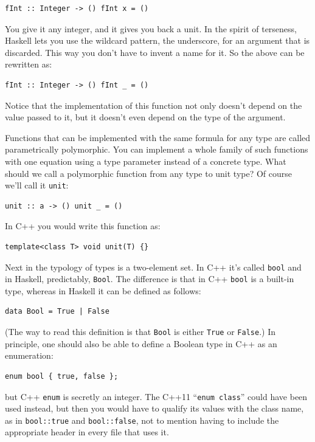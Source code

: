 \begin{verbatim}
fInt :: Integer -> () fInt x = ()
\end{verbatim}

You give it any integer, and it gives you back a unit. In the spirit of
terseness, Haskell lets you use the wildcard pattern, the underscore,
for an argument that is discarded. This way you don't have to invent a
name for it. So the above can be rewritten as:

\begin{verbatim}
fInt :: Integer -> () fInt _ = ()
\end{verbatim}

Notice that the implementation of this function not only doesn't depend
on the value passed to it, but it doesn't even depend on the type of the
argument.

Functions that can be implemented with the same formula for any type are
called parametrically polymorphic. You can implement a whole family of
such functions with one equation using a type parameter instead of a
concrete type. What should we call a polymorphic function from any type
to unit type? Of course we'll call it \texttt{unit}:

\begin{verbatim}
unit :: a -> () unit _ = ()
\end{verbatim}

In C++ you would write this function as:

\begin{verbatim}
template<class T> void unit(T) {}
\end{verbatim}

Next in the typology of types is a two-element set. In C++ it's called
\texttt{bool} and in Haskell, predictably, \texttt{Bool}. The difference
is that in C++ \texttt{bool} is a built-in type, whereas in Haskell it
can be defined as follows:

\begin{verbatim}
data Bool = True | False
\end{verbatim}

(The way to read this definition is that \texttt{Bool} is either
\texttt{True} or \texttt{False}.) In principle, one should also be able
to define a Boolean type in C++ as an enumeration:

\begin{verbatim}
enum bool { true, false };
\end{verbatim}

but C++ \texttt{enum} is secretly an integer. The C++11
``\texttt{enum\ class}'' could have been used instead, but then you
would have to qualify its values with the class name, as in
\texttt{bool::true} and \texttt{bool::false}, not to mention having to
include the appropriate header in every file that uses it.

